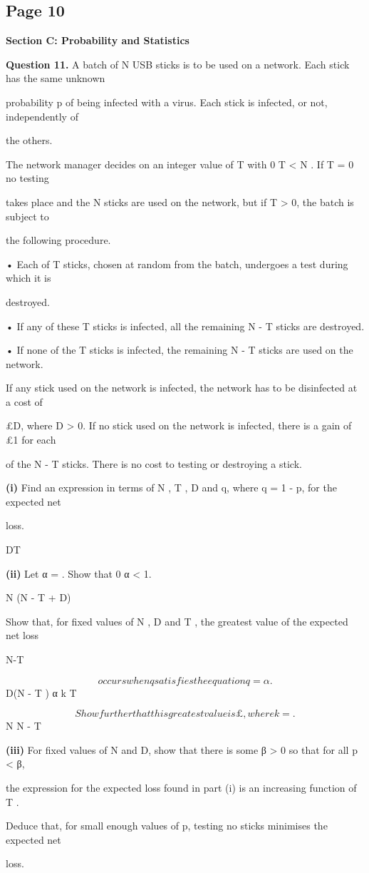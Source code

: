 \documentclass[12pt]{article}
\begin{document}
\subsection*{Page 10}
\begin{flushleft}
\bigskip\textbf{Section C: Probability and Statistics}\par
\bigskip\textbf{Question 11.} A batch of N USB sticks is to be used on a network. Each stick has the same unknown\par
probability p of being infected with a virus. Each stick is infected, or not, independently of\par
the others.\par
The network manager decides on an integer value of T with 0 \geq T < N . If T = 0 no testing\par
takes place and the N sticks are used on the network, but if T > 0, the batch is subject to\par
the following procedure.\par
• Each of T sticks, chosen at random from the batch, undergoes a test during which it is\par
destroyed.\par
• If any of these T sticks is infected, all the remaining N - T sticks are destroyed.\par
• If none of the T sticks is infected, the remaining N - T sticks are used on the network.\par
If any stick used on the network is infected, the network has to be disinfected at a cost of\par
\pounds D, where D > 0. If no stick used on the network is infected, there is a gain of \pounds 1 for each\par
of the N - T sticks. There is no cost to testing or destroying a stick.\par
\textbf{(i)} Find an expression in terms of N , T , D and q, where q = 1 - p, for the expected net\par
loss.\par
DT\par
\textbf{(ii)} Let α = . Show that 0 \geq α < 1.\par
N (N - T + D)\par
Show that, for fixed values of N , D and T , the greatest value of the expected net loss\par
N-T\par
\[occurs when q satisfies the equation q = α.\]
D(N - T ) α k T\par
\[Show further that this greatest value is \pounds  , where k = .\]
N N - T\par
\textbf{(iii)} For fixed values of N and D, show that there is some β > 0 so that for all p < β,\par
the expression for the expected loss found in part (i) is an increasing function of T .\par
Deduce that, for small enough values of p, testing no sticks minimises the expected net\par
loss.\par
\end{flushleft}
\end{document}
